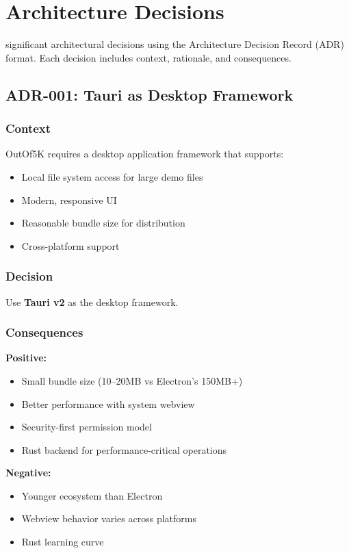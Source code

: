 \chapter{Architecture Decisions}
\label{ch:decisions}

 significant architectural decisions using the Architecture Decision Record (ADR) format. Each decision includes context, rationale, and consequences.

\section{ADR-001: Tauri as Desktop Framework}

\subsection{Context}
OutOf5K requires a desktop application framework that supports:
\begin{itemize}
    \item Local file system access for large demo files
    \item Modern, responsive UI
    \item Reasonable bundle size for distribution
    \item Cross-platform support
\end{itemize}

\subsection{Decision}
Use \textbf{Tauri v2} as the desktop framework.

\subsection{Consequences}

\textbf{Positive:}
\begin{itemize}
    \item Small bundle size (10--20MB vs Electron's 150MB+)
    \item Better performance with system webview
    \item Security-first permission model
    \item Rust backend for performance-critical operations
\end{itemize}

\textbf{Negative:}
\begin{itemize}
    \item Younger ecosystem than Electron
    \item Webview behavior varies across platforms
    \item Rust learning curve
\end{itemize}

